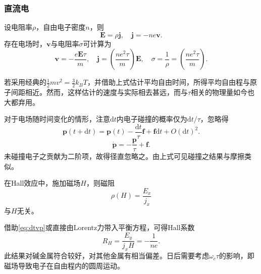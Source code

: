 \documentclass{ctexart}
\newcommand{\rd}[1]{\mathrm{d} #1}
\newcommand{\dt}{\rd{t}}
\newcommand{\pare}[1]{\left( #1 \right)}
\newcommand{\rec}[1]{\frac{1}{#1}}
\newcommand{\vE}{\boldsymbol{E}}
\newcommand{\vf}{\boldsymbol{f}}
\newcommand{\vj}{\boldsymbol{j}}
\newcommand{\vp}{\boldsymbol{p}}
\newcommand{\vv}{\boldsymbol{v}}
\newcommand{\half}{\frac{1}{2}}
\newcommand{\thalf}{\frac{3}{2}}
\begin{document}
\subsubsection{直流电}
设电阻率$\rho$，自由电子密度$n$，则
\[ \vE = \rho \vj, \quad \vj = -ne\vv. \]
存在电场时，$\vv$与电阻率$\sigma$可计算为
\begin{equation}
\label{eq:rhotau}
\vv = -\frac{e\vE \tau}{m}, \quad \vj = \pare{\frac{ne^2\tau}{m}}\vE, \quad \sigma = \rec{\rho} =  \pare{\frac{ne^2\tau}{m}}.
\end{equation}
\par
若采用经典的$\half mv^2 = \thalf k_B T$，并借助上式估计平均自由时间，所得平均自由程与原子间距相近。然而，这样估计的速度与实际相去甚远，而与$\tau$相关的物理量如今也大都弃用。
\par
对于电场随时间变化的情形，注意$\dt$内电子碰撞的概率仅为$\dt/\tau$，忽略得
\[ \vp\pare{t+\dt} = \vp\pare{t} - \frac{\dt}{\tau}\vf + \vf\dt + O\pare{\dt}^2. \]
\begin{equation}
\label{eq:dtvp}
\dot{\vp} = -\frac{\vp}{\tau} + \vf.
\end{equation}
未碰撞电子之贡献为二阶项，故得径直忽略之。由上式可见碰撞之结果与摩擦类似。
\par
在Hall效应中，施加磁场$H$，则磁阻
\[ \rho\pare{H} = \frac{E_x}{j_x} \]
与$H$无关。
\par
借助\eqref{eq:dtvp}或直接由Lorentz力带入平衡方程，可得Hall系数
\[ R_H = \frac{E_y}{j_x H} = -\rec{ne}. \]
此结果对碱金属符合较好，对其他金属有相当偏差。日后需要考虑$\omega_c \tau$的影响，即磁场导致电子在自由程内的圆周运动。
\end{document}
